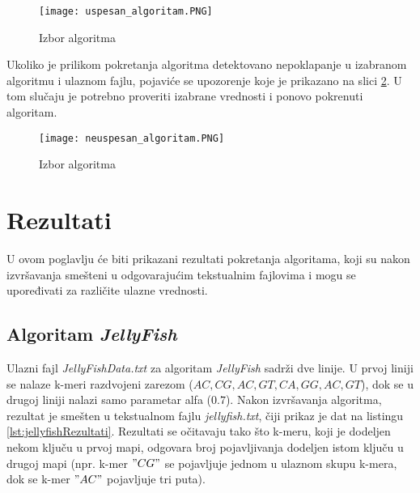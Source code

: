 \documentclass[12pt,oneside]{memoir}
\begin{document}

\begin{figure}[h]
\centering
\texttt{[image: uspesan\_algoritam.PNG]}
\caption{Izbor algoritma}
\label{fig:uspesnoIzvrsavanje}
\end{figure}

Ukoliko je prilikom pokretanja algoritma detektovano nepoklapanje u izabranom algoritmu i ulaznom fajlu, pojaviće se upozorenje koje je prikazano na slici \ref{fig:neuspesnoIzvrsavanje}. U tom slučaju je potrebno proveriti izabrane vrednosti i ponovo pokrenuti algoritam.

\begin{figure}[h]
\centering
\texttt{[image: neuspesan\_algoritam.PNG]}
\caption{Izbor algoritma}
\label{fig:neuspesnoIzvrsavanje}
\end{figure}

\newpage

\section{Rezultati}
\label{odeljak:Rezultati}

U ovom poglavlju će biti prikazani rezultati pokretanja algoritama, koji su nakon izvršavanja smešteni u odgovarajućim tekstualnim fajlovima i mogu se upoređivati za različite ulazne vrednosti.

\subsection{Algoritam \textit{JellyFish}}
\label{pododeljak:jellyfish}

Ulazni fajl \textit{JellyFishData.txt} za algoritam \textit{JellyFish} sadrži dve linije. U prvoj liniji se nalaze k-meri razdvojeni zarezom ($AC,CG,AC,GT,CA,GG,AC,GT$), dok se u drugoj liniji nalazi samo parametar alfa ($0.7$). Nakon izvršavanja algoritma, rezultat je smešten u tekstualnom fajlu \textit{jellyfish.txt}, čiji prikaz je dat na listingu \ref{lst:jellyfishRezultati}. Rezultati se očitavaju tako što k-meru, koji je dodeljen nekom ključu u prvoj mapi, odgovara broj pojavljivanja dodeljen istom ključu u drugoj mapi (npr. k-mer $"CG"$ se pojavljuje jednom u ulaznom skupu k-mera, dok se k-mer $"AC"$ pojavljuje tri puta).
\end{document}
